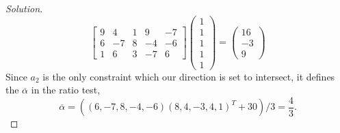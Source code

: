 \documentclass[12pt]{article}
\makeatletter
\theoremstyle{homework}
\newenvironment{exercise}[1]
{\def\@currentlabel{#1}\exercisecore}
{\endexercisecore}
\makeatother
\begin{document}
\begin{exercise}{1.3}
\begin{enumerate}
\begin{proof}[Solution]
      \begin{equation*}
        \begin{bmatrix}9&4&1&9&-7\\ 6&-7&8&-4&-6\\ 1&6&3&-7&6\end{bmatrix}\begin{pmatrix}1\\ 1\\ 1\\ 1\\ 1\end{pmatrix}=\begin{pmatrix}16\\ -3\\ 9\end{pmatrix}
      \end{equation*}
      Since $a_2$ is the only constraint which our direction is set to intersect, it defines the $\overline{\alpha}$ in the ratio test, 
      \begin{equation*}
        \overline{\alpha} = ((6, -7, 8, -4, -6)(8, 4, -3, 4, 1)^T + 30)/3 = \frac{4}{3}.
      \end{equation*}
    \end{proof}
    \vspace{.15in}


\end{enumerate}
\end{exercise}
\end{document}
